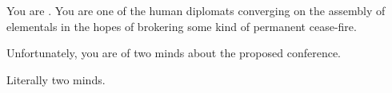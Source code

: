 \documentclass[char]{elementals}
\begin{document}
\name{\cAvatar{}}

You are \cAvatar{\intro}.  You are one of the human diplomats converging on the assembly of elementals in the hopes of brokering some kind of permanent cease-fire.

Unfortunately, you are of two minds about the proposed conference.

Literally two minds.
\end{document}
